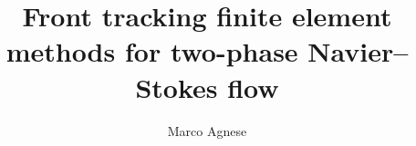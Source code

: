 \title{Front tracking finite element methods for two-phase Navier--Stokes flow}
\author{Marco Agnese}

